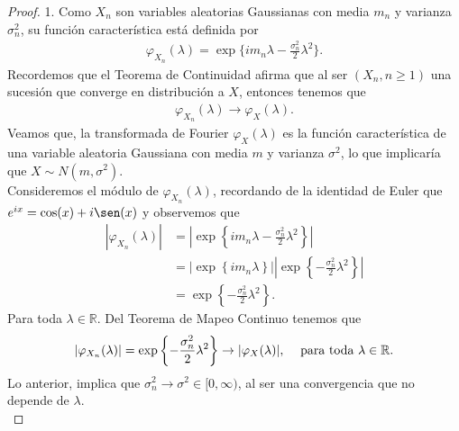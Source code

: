 \begin{proof}
1. Como $X_n$ son variables aleatorias Gaussianas con media $m_n$ y varianza $\sigma_n^2$, su función característica está definida por
	\begin{align*}
	\varphi_{X_n} (\lambda) = \exp \{i m_n \lambda - \frac{\sigma_n^2}{2} \lambda^2\}. %
	\end{align*}
Recordemos que el Teorema de Continuidad \cite[p.~322]{shiryaev} afirma que al ser $(X_n, n \geq 1)$ una sucesión que converge en distribución a $X$, entonces tenemos que 
	\begin{align*}
	\varphi_{X_n} (\lambda) \rightarrow \varphi_{X} (\lambda). 
	\end{align*}
Veamos que, la transformada de Fourier $\varphi_X(\lambda)$ es la función característica de una variable aleatoria Gaussiana con media $m$ y varianza $\sigma^2$, lo que implicaría que $X \sim N(m, \sigma^2)$. \\

Consideremos el módulo de $\varphi_{X_n} (\lambda)$, recordando de la identidad de Euler que $e^{ix} = \cos(x) + i \sen(x)$ y observemos que
	\begin{align*}
	|\varphi_{X_n} (\lambda)| &=  \left \lvert \exp \left\{i m_n \lambda - \frac{\sigma_n^2}{2} \lambda^2 \right\} \right \rvert \\
	& = \bigg \lvert \exp \left\{i m_n \lambda \right\} \bigg \rvert  \left\lvert \exp \left\{ - \frac{\sigma_n^2}{2} \lambda^2 \right\} \right\rvert\\
	& = \exp \left\{- \frac{\sigma_n^2}{2} \lambda^2 \right\}.
	\end{align*}
Para toda $\lambda \in \mathbb{R}$. Del Teorema de Mapeo Continuo \cite[p.~21]{billingsley} tenemos que
	\begin{align*}
	|\varphi_{X_n} (\lambda)| = \exp \left\{- \frac{\sigma_n^2}{2} \lambda^2 \right\} \rightarrow |\varphi_X (\lambda)|, \hspace{0.3cm} \text{ para toda } \lambda \in \mathbb{R}.
	\end{align*}
Lo anterior, implica que  $\sigma_n^2 \rightarrow \sigma^2 \in [0, \infty)$, al ser una convergencia que no depende de $\lambda$. \\


\end{proof}
